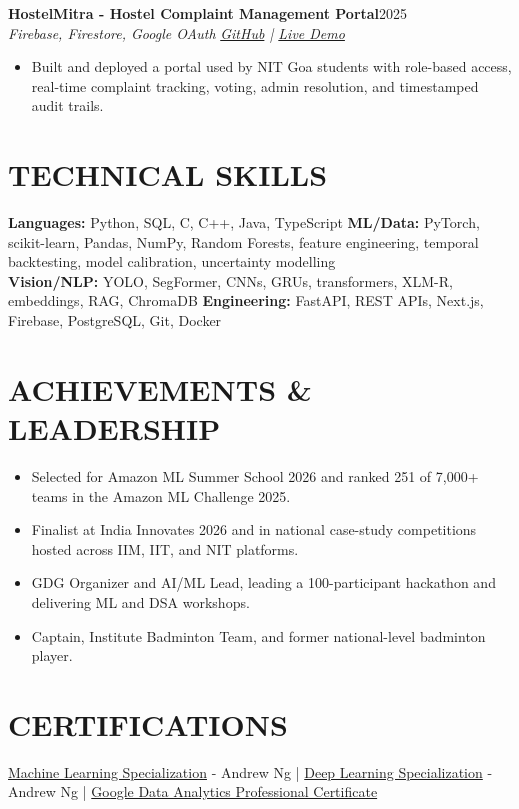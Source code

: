 \documentclass[9pt,a4paper]{extarticle}
\newcommand{\subhdr}[2]{\textbf{#1}\hfill #2}
\newcommand{\entryspace}{\vspace{2.0pt}}
\begin{document}
\entryspace
\subhdr{HostelMitra - Hostel Complaint Management Portal}{2025}\\[-0.5pt]
\textit{Firebase, Firestore, Google OAuth}
\hfill \textit{\href{https://github.com/Kumaryan12/HostelMitra}{GitHub} \;|\; \href{https://hostelmitra-81b7d.web.app/}{Live Demo}}
\begin{itemize}
  \item Built and deployed a portal used by NIT Goa students with role-based access, real-time complaint tracking, voting, admin resolution, and timestamped audit trails.
\end{itemize}

\section*{TECHNICAL SKILLS}
\textbf{Languages:} Python, SQL, C, C++, Java, TypeScript \quad
\textbf{ML/Data:} PyTorch, scikit-learn, Pandas, NumPy, Random Forests, feature engineering, temporal backtesting, model calibration, uncertainty modelling\\[1.2pt]
\textbf{Vision/NLP:} YOLO, SegFormer, CNNs, GRUs, transformers, XLM-R, embeddings, RAG, ChromaDB \quad
\textbf{Engineering:} FastAPI, REST APIs, Next.js, Firebase, PostgreSQL, Git, Docker

\section*{ACHIEVEMENTS \& LEADERSHIP}
\begin{itemize}
  \item Selected for Amazon ML Summer School 2026 and ranked 251 of 7,000+ teams in the Amazon ML Challenge 2025.
  \item Finalist at India Innovates 2026 and in national case-study competitions hosted across IIM, IIT, and NIT platforms.
  \item GDG Organizer and AI/ML Lead, leading a 100-participant hackathon and delivering ML and DSA workshops.
  \item Captain, Institute Badminton Team, and former national-level badminton player.
\end{itemize}

\section*{CERTIFICATIONS}
\href{https://coursera.org/share/511694705d0c1469932469d414a1ecf8}{Machine Learning Specialization} - Andrew Ng
\;|\;
\href{https://coursera.org/share/1a69a528708b69bd212760cf799adc44}{Deep Learning Specialization} - Andrew Ng
\;|\;
\href{https://coursera.org/share/accadfe20f17ba63ad1d025391ce92eb}{Google Data Analytics Professional Certificate}
\end{document}
